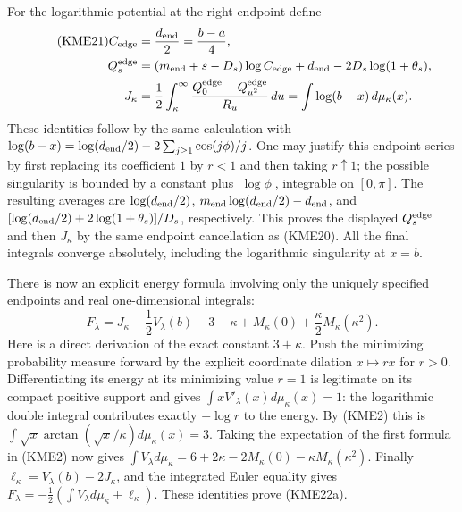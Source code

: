 \documentclass[11pt,a4paper]{article}
\begin{document}
For the logarithmic potential at the right endpoint define
\begin{align}\tag{KME21}
 C_{\rm edge}&=\frac{d_{\rm end}}2=\frac{b-a}{4},\\
 Q_s^{\rm edge}&=(m_{\rm end}+s-D_s)\log C_{\rm edge}
                            +d_{\rm end}-2D_s\log(1+\theta_s),\notag\\
 J_\kappa&=\frac12\int_\kappa^\infty
                  \frac{Q_0^{\rm edge}-Q_{u^2}^{\rm edge}}{R_u}\,du
       =\int\log(b-x)\,d\mu_\kappa(x).\notag
\end{align}
These identities follow by the same calculation with
$\log(b-x)=\log(d_{\rm end}/2)-2\sum_{j\geq1}\cos(j\phi)/j$.
One may justify this endpoint series by first replacing its coefficient
$1$ by $r<1$ and then taking $r\uparrow1$; the possible singularity is
bounded by a constant plus $|\log\phi|$, integrable on $[0,\pi]$.
The resulting averages are $\log(d_{\rm end}/2)$, $m_{\rm end}\log(d_{\rm end}/2)-d_{\rm end}$, and
$[\log(d_{\rm end}/2)+2\log(1+\theta_s)]/D_s$, respectively.
This proves the displayed $Q_s^{\rm edge}$ and then $J_\kappa$ by the
same endpoint cancellation as (KME20). All the final integrals converge
absolutely, including the logarithmic singularity at $x=b$.

There is now an explicit energy formula involving only the uniquely
specified endpoints and real one-dimensional integrals:
\begin{equation}\tag{KME22a}
 \boxed{F_\lambda=J_\kappa-\frac12V_\lambda(b)-3-\kappa
                       +M_\kappa(0)+\frac \kappa2M_\kappa(\kappa^2).}
\end{equation}
Here is a direct derivation of the exact constant $3+\kappa$.
Push the minimizing probability measure forward by the explicit
coordinate dilation $x\mapsto r x$ for $r>0$. Differentiating its energy
at its minimizing value $r=1$ is legitimate on its compact positive
support and gives $\int xV'_\lambda(x)d\mu_\kappa(x)=1$: the logarithmic
double integral contributes exactly $-\log r$ to the energy.
By (KME2) this is
$\int\sqrt x\arctan(\sqrt x/\kappa)d\mu_\kappa(x)=3$.
Taking the expectation of the first formula in (KME2) now gives
$\int V_\lambda d\mu_\kappa=6+2\kappa-2M_\kappa(0)-\kappa M_\kappa(\kappa^2)$.
Finally $\ell_\kappa=V_\lambda(b)-2J_\kappa$, and the integrated Euler equality
gives $F_\lambda=-\tfrac12(\int V_\lambda d\mu_\kappa+\ell_\kappa)$.
These identities prove (KME22a).
\end{document}
